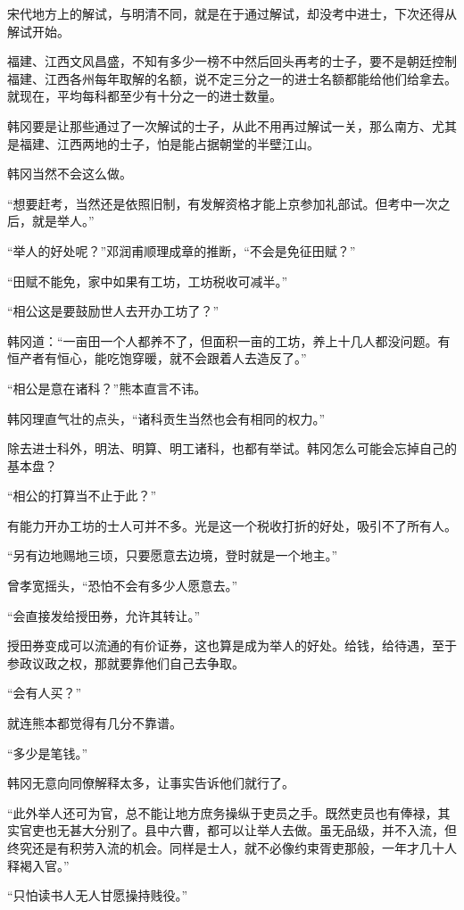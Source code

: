 宋代地方上的解试，与明清不同，就是在于通过解试，却没考中进士，下次还得从解试开始。

福建、江西文风昌盛，不知有多少一榜不中然后回头再考的士子，要不是朝廷控制福建、江西各州每年取解的名额，说不定三分之一的进士名额都能给他们给拿去。就现在，平均每科都至少有十分之一的进士数量。

韩冈要是让那些通过了一次解试的士子，从此不用再过解试一关，那么南方、尤其是福建、江西两地的士子，怕是能占据朝堂的半壁江山。

韩冈当然不会这么做。

“想要赶考，当然还是依照旧制，有发解资格才能上京参加礼部试。但考中一次之后，就是举人。”

“举人的好处呢？”邓润甫顺理成章的推断，“不会是免征田赋？”

“田赋不能免，家中如果有工坊，工坊税收可减半。”

“相公这是要鼓励世人去开办工坊了？”

韩冈道：“一亩田一个人都养不了，但面积一亩的工坊，养上十几人都没问题。有恒产者有恒心，能吃饱穿暖，就不会跟着人去造反了。”

“相公是意在诸科？”熊本直言不讳。

韩冈理直气壮的点头，“诸科贡生当然也会有相同的权力。”

除去进士科外，明法、明算、明工诸科，也都有举试。韩冈怎么可能会忘掉自己的基本盘？

“相公的打算当不止于此？”

有能力开办工坊的士人可并不多。光是这一个税收打折的好处，吸引不了所有人。

“另有边地赐地三顷，只要愿意去边境，登时就是一个地主。”

曾孝宽摇头，“恐怕不会有多少人愿意去。”

“会直接发给授田券，允许其转让。”

授田券变成可以流通的有价证券，这也算是成为举人的好处。给钱，给待遇，至于参政议政之权，那就要靠他们自己去争取。

“会有人买？”

就连熊本都觉得有几分不靠谱。

“多少是笔钱。”

韩冈无意向同僚解释太多，让事实告诉他们就行了。

“此外举人还可为官，总不能让地方庶务操纵于吏员之手。既然吏员也有俸禄，其实官吏也无甚大分别了。县中六曹，都可以让举人去做。虽无品级，并不入流，但终究还是有积劳入流的机会。同样是士人，就不必像约束胥吏那般，一年才几十人释褐入官。”

“只怕读书人无人甘愿操持贱役。”

